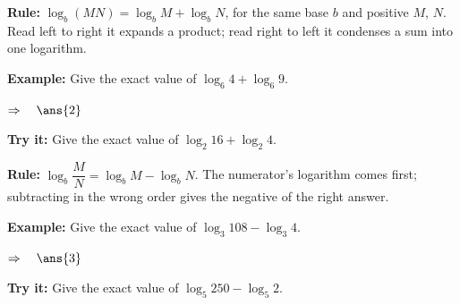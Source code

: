 \documentclass[12pt]{article}
\begin{document}


\begin{formulabox}
\textbf{Rule:} $\log_b(MN) = \log_b M + \log_b N$, for the same base $b$ and
positive $M$, $N$. Read left to right it expands a product; read right to left it
condenses a sum into one logarithm.
\end{formulabox}

\begin{examplebox}
\textbf{Example:} \quad Give the exact value of $\log_6 4 + \log_6 9$.

$\Rightarrow\quad \ans{2}$
\end{examplebox}

\begin{tryitbox}
\textbf{Try it:} \quad Give the exact value of $\log_2 16 + \log_2 4$.\\[2pt]
\end{tryitbox}


\begin{formulabox}
\textbf{Rule:} $\log_b\!\dfrac{M}{N} = \log_b M - \log_b N$. The numerator's
logarithm comes first; subtracting in the wrong order gives the negative of the
right answer.
\end{formulabox}

\begin{examplebox}
\textbf{Example:} \quad Give the exact value of $\log_3 108 - \log_3 4$.

$\Rightarrow\quad \ans{3}$
\end{examplebox}

\begin{tryitbox}
\textbf{Try it:} \quad Give the exact value of $\log_5 250 - \log_5 2$.\\[2pt]
\end{tryitbox}
\end{document}

